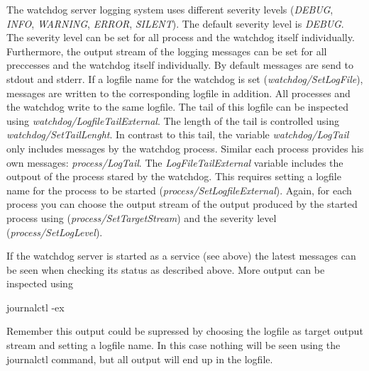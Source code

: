 The watchdog server logging system uses different severity levels ({\itshape D\+E\+B\+UG}, {\itshape I\+N\+FO}, {\itshape W\+A\+R\+N\+I\+NG}, {\itshape E\+R\+R\+OR}, {\itshape S\+I\+L\+E\+NT}). The default severity level is {\itshape D\+E\+B\+UG}. The severity level can be set for all process and the watchdog itself individually. Furthermore, the output stream of the logging messages can be set for all preccesses and the watchdog itself individually. By default messages are send to stdout and stderr. If a logfile name for the watchdog is set ({\itshape watchdog/\+Set\+Log\+File}), messages are written to the corresponding logfile in addition. All processes and the watchdog write to the same logfile. The tail of this logfile can be inspected using {\itshape watchdog/\+Logfile\+Tail\+External}. The length of the tail is controlled using {\itshape watchdog/\+Set\+Tail\+Lenght}. In contrast to this tail, the variable {\itshape watchdog/\+Log\+Tail} only includes messages by the watchdog process. Similar each process provides his own messages\+: {\itshape process/\+Log\+Tail}. The {\itshape Log\+File\+Tail\+External} variable includes the outpout of the process stared by the watchdog. This requires setting a logfile name for the process to be started ({\itshape process/\+Set\+Logfile\+External}). Again, for each process you can choose the output stream of the output produced by the started process using ({\itshape process/\+Set\+Target\+Stream}) and the severity level ({\itshape process/\+Set\+Log\+Level}).

If the watchdog server is started as a service (see above) the latest messages can be seen when checking its status as described above. More output can be inspected using \begin{DoxyVerb}journalctl -ex
\end{DoxyVerb}


Remember this output could be supressed by choosing the logfile as target output stream and setting a logfile name. In this case nothing will be seen using the {\ttfamily journalctl} command, but all output will end up in the logfile. 